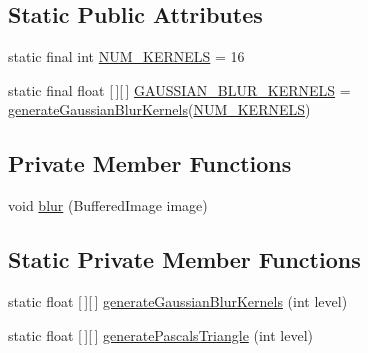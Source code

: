 \subsection*{Static Public Attributes}
\begin{DoxyCompactItemize}
\item 
static final int \mbox{\hyperlink{classorg_1_1newdawn_1_1slick_1_1font_1_1effects_1_1_shadow_effect_a50382c2f00212657b6a062adb899d224}{N\+U\+M\+\_\+\+K\+E\+R\+N\+E\+LS}} = 16
\item 
static final float \mbox{[}$\,$\mbox{]}\mbox{[}$\,$\mbox{]} \mbox{\hyperlink{classorg_1_1newdawn_1_1slick_1_1font_1_1effects_1_1_shadow_effect_a7edefffb2d5466f8a726596a38ced771}{G\+A\+U\+S\+S\+I\+A\+N\+\_\+\+B\+L\+U\+R\+\_\+\+K\+E\+R\+N\+E\+LS}} = \mbox{\hyperlink{classorg_1_1newdawn_1_1slick_1_1font_1_1effects_1_1_shadow_effect_a52516d25971f838f5cc677a3efe09eff}{generate\+Gaussian\+Blur\+Kernels}}(\mbox{\hyperlink{classorg_1_1newdawn_1_1slick_1_1font_1_1effects_1_1_shadow_effect_a50382c2f00212657b6a062adb899d224}{N\+U\+M\+\_\+\+K\+E\+R\+N\+E\+LS}})
\end{DoxyCompactItemize}
\subsection*{Private Member Functions}
\begin{DoxyCompactItemize}
\item 
void \mbox{\hyperlink{classorg_1_1newdawn_1_1slick_1_1font_1_1effects_1_1_shadow_effect_aed27870d89b30c23752f5dfc30314578}{blur}} (Buffered\+Image image)
\end{DoxyCompactItemize}
\subsection*{Static Private Member Functions}
\begin{DoxyCompactItemize}
\item 
static float \mbox{[}$\,$\mbox{]}\mbox{[}$\,$\mbox{]} \mbox{\hyperlink{classorg_1_1newdawn_1_1slick_1_1font_1_1effects_1_1_shadow_effect_a52516d25971f838f5cc677a3efe09eff}{generate\+Gaussian\+Blur\+Kernels}} (int level)
\item 
static float \mbox{[}$\,$\mbox{]}\mbox{[}$\,$\mbox{]} \mbox{\hyperlink{classorg_1_1newdawn_1_1slick_1_1font_1_1effects_1_1_shadow_effect_a4045a468e4498b08516b172462f12d1a}{generate\+Pascals\+Triangle}} (int level)
\end{DoxyCompactItemize}
